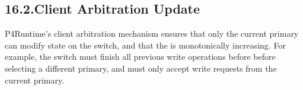 \documentclass[11pt]{article}
\begin{document}
{%
\subsection{16.2.\hspace*{0.5em}Client Arbitration Update}\label{sec-client-arbitration-update}%

\noindent{}P4Runtime's client arbitration mechanism ensures that only the current primary
can modify state on the switch, and that the  is monotonically
increasing. For example, the switch must finish all previous write operations
before before selecting a different primary, and must only accept write requests
from the current primary.%

}
\end{document}

